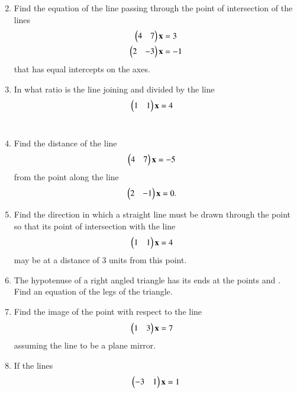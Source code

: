 \begin{enumerate}[label=\arabic*.,ref=\thesubsection.\theenumi]
\begin{align}
\end{align}
\\
\solution

%
\item Find the equation of the line passing through the point of intersection of the lines 
%
\begin{align}
\begin{pmatrix}4 & 7\end{pmatrix}\mathbf{x} &= 3
\\
\begin{pmatrix}2 & -3\end{pmatrix}\mathbf{x} &= -1
\end{align}
%
that has equal intercepts on the axes.
%
\item In what ratio is the line joining  and  divided by the line
%
\begin{align}
\begin{pmatrix}1 & 1\end{pmatrix}\mathbf{x} &= 4
\end{align}
%
\\
\solution

\item Find the distance of the line 
%
\begin{align}
\begin{pmatrix}4 & 7\end{pmatrix}\mathbf{x} &= -5
\end{align}
%
from the point  along the line 
%
\begin{align}
\begin{pmatrix}2 & -1\end{pmatrix}\mathbf{x} &= 0.
\end{align}
%
\item Find the direction in which a straight line must be drawn through the point  so that its point of intersection with the line 
%
\begin{align}
\begin{pmatrix}1 & 1\end{pmatrix}\mathbf{x} &= 4
\end{align}
%
may be at a distance of 3 units from this point.
\item The hypotenuse of a right angled triangle has its ends at the points  and . Find an equation of the legs of the triangle.
\item Find the image of the point  with respect to the line 
%
\begin{align}
\begin{pmatrix}1 & 3\end{pmatrix}\mathbf{x} &= 7
\end{align}
%
assuming the line to be a plane mirror.
%
\item If the lines
%
%
\begin{align}
\myvec{-3 & 1}\vec{x} &= 1
\\

\end{align}
\end{enumerate}
